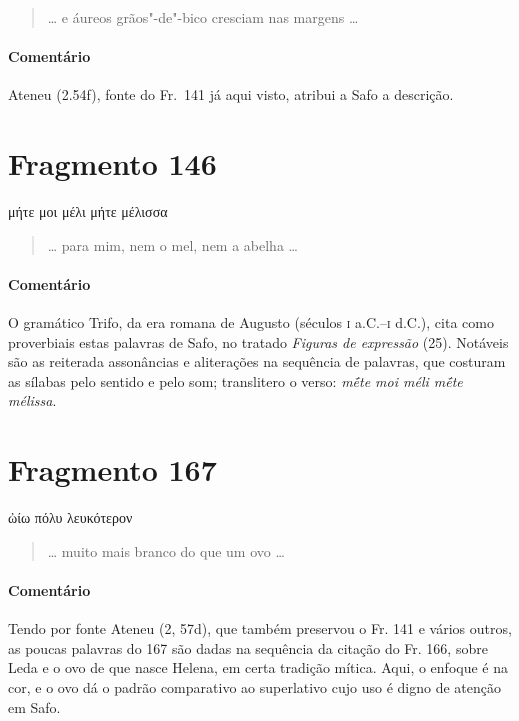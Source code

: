 {\begin{verse}
\ldots{} e áureos grãos"-de"-bico cresciam nas margens \ldots{}
\end{verse}

{\paragraph{Comentário} Ateneu (2.54f), fonte do Fr.~141 já aqui visto, atribui a Safo a descrição.}


\pagebreak
\section{Fragmento 146}

\begin{gkverse}
μήτε μοι μέλι μήτε μέλισσα
\end{gkverse}

\begin{verse}
\ldots{} para mim, nem o mel, nem a abelha \ldots{}
\end{verse}

{\paragraph{Comentário} O gramático Trifo, da era romana de Augusto (séculos \textsc{i} a.C.--\textsc{i} d.C.), 
cita como proverbiais estas palavras de Safo, no tratado \textit{Figuras de expressão} (25).
Notáveis são as reiterada assonâncias e aliterações na sequência de palavras, que costuram as sílabas pelo sentido e pelo som; translitero o verso: \textit{mḗte moi méli mḗte mélissa}.}


\section{Fragmento 167}

\begin{gkverse}
ὠίω πόλυ λευκότερον
\end{gkverse}

\begin{verse}
\ldots{} muito mais branco do que um ovo \ldots{}
\end{verse}

{\paragraph{Comentário} Tendo por fonte Ateneu (2, 57d), que também preservou o Fr. 141 e vários outros, as poucas palavras do 167 são dadas na sequência da citação do Fr. 166, sobre Leda e o ovo de que nasce Helena, em certa tradição mítica. Aqui, o enfoque é na cor, e o ovo dá o padrão comparativo ao superlativo cujo uso é digno de atenção em Safo.}


}
